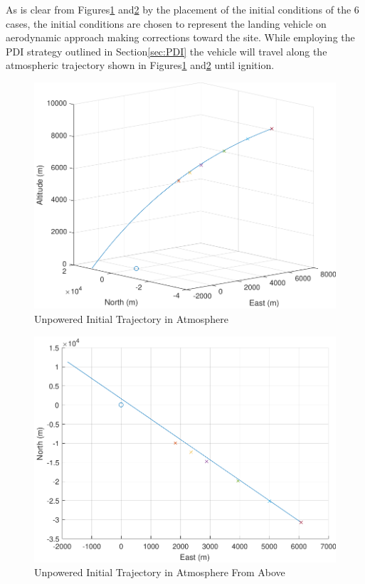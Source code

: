 As is clear from Figures\:\ref{fig:trajunpowatmo_1} and\:\:\ref{fig:trajunpowatmo_2} by the placement of the initial conditions of the 6 cases, the initial conditions are chosen to represent the landing vehicle on aerodynamic approach making corrections toward the site. While employing the PDI strategy outlined in Section\:\ref{sec:PDI} the vehicle will travel along the atmospheric trajectory shown in Figures\:\ref{fig:trajunpowatmo_1} and\:\ref{fig:trajunpowatmo_2} until ignition.

\begin{figure}[H]
	\centering
	\begin{minipage}{4.3 in}
		\includegraphics[width=\linewidth]{Figures/trajunpowatmo_1.pdf}
		\caption{Unpowered Initial Trajectory in Atmosphere \label{fig:trajunpowatmo_1} }
	\end{minipage}
\end{figure}

\begin{figure}[H]
	\centering
	\begin{minipage}{4.3 in}
		\includegraphics[width=\linewidth]{Figures/trajunpowatmo_2.pdf}
		\caption{Unpowered Initial Trajectory in Atmosphere From Above \label{fig:trajunpowatmo_2} }
	\end{minipage}
\end{figure}


